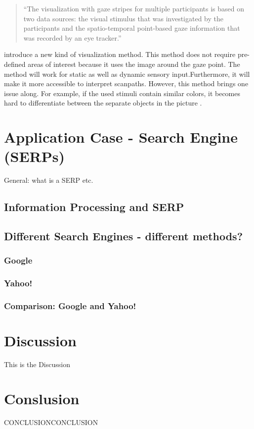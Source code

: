 \begin{quote}
``The visualization with gaze stripes for multiple participants is based on two data sources: the visual stimulus that was investigated by the participants and the spatio-temporal point-based gaze information that was recorded by an eye tracker.''
\autocite[3]{kurzhals2016gaze}
\end{quote}

\textcite[]{kurzhals2016gaze} introduce a new kind of visualization method. This method does not require pre-defined areas of interest because it uses the image around the gaze point. The method will work for static as well as dynamic sensory input.Furthermore, it will make it more accessible to interpret scanpaths. 
However, this method brings one issue along. For example, if the used stimuli contain similar colors, it becomes hard to differentiate between the separate objects in the picture \autocite[]{kurzhals2016gaze}.

\section{Application Case - Search Engine (SERPs)}
\label{section:SearchEngine}
General: what is a SERP etc.

\subsection{Information Processing and SERP}
\label{subsection:ReadingSERP}

\subsection{Different Search Engines - different methods?}
\label{subsection:SearchEngine}

\subsubsection{Google}

\subsubsection{Yahoo!}

\subsubsection{Comparison: Google and Yahoo!}

\section{Discussion}
\label{section:Discussion}
This is the Discussion

\section{Conslusion}
\label{section:Conclusion}
CONCLUSIONCONCLUSION